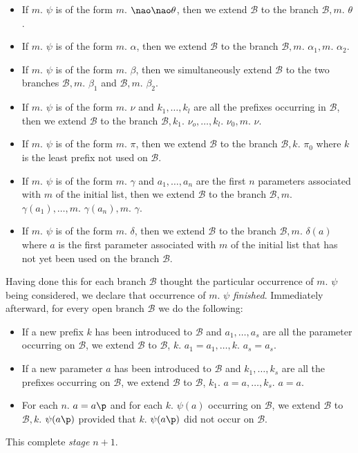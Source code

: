 \begin{defn}
\begin{itemize}
\item If $m.$ $\psi$ is of the form $m.$ $\nao \nao \theta$, then we extend $\mathcal{B}$ to the branch $\mathcal{B}, m.$ $\theta$. 
\item If $m.$ $\psi$ is of the form $m.$ $\alpha$, then we extend $\mathcal{B}$ to the branch $\mathcal{B}, m.$ $\alpha_{1},m.$ $\alpha_{2}$. 
\item If $m.$ $\psi$ is of the form $m.$ $\beta$, then we simultaneously extend $\mathcal{B}$ to the two branches $\mathcal{B}, m.$ $\beta_{1}$ and $\mathcal{B}, m.$ $\beta_{2}$.
\item If $m.$ $\psi$ is of the form $m.$ $\nu$ and $k_{1}, \dots , k_{l}$ are all the prefixes occurring in $\mathcal{B}$, then we extend $\mathcal{B}$ to the branch $\mathcal{B}, k_{1}.$ $\nu_{o}, \dots, k_{l}.$ $\nu_{0}, m.$ $\nu$.
\item If $m.$ $\psi$ is of the form $m.$ $\pi$, then we extend $\mathcal{B}$ to the branch $\mathcal{B}, k.$ $\pi_{0}$ where $k$ is the least prefix not used on $\mathcal{B}$.
\item If $m.$ $\psi$ is of the form $m.$ $\gamma$ and  $a_{1}, \dots , a_{n}$ are the first $n$ parameters associated with $m$ of the initial list, then we extend $\mathcal{B}$ to the branch $\mathcal{B}, m.$ $\gamma(a_{1}), \dots, m.$ $\gamma(a_{n}), m.$ $\gamma$.
\item If $m.$ $\psi$ is of the form $m.$ $\delta$, then we extend $\mathcal{B}$ to the branch $\mathcal{B}, m.$ $\delta(a)$ where $a$ is the first parameter associated with $m$ of the initial list that has not yet been used on the branch $\mathcal{B}$.
\end{itemize}

\qquad Having done this for each branch $\mathcal{B}$ thought the particular occurrence of $m.$ $\psi$  being considered, we declare that occurrence of $m.$ $\psi$  \textit{finished}. Immediately afterward, for every open branch $\mathcal{B}$ we do the following:

\begin{itemize}
\item If a new prefix $k$ has been introduced to $\mathcal{B}$ and $a_{1}, \dots, a_{s}$ are all the parameter occurring on $\mathcal{B}$, we extend $\mathcal{B}$ to $\mathcal{B}$, $k.$ $a_{1} = a_{1}, \dots,k.$ $a_{s} = a_{s}$.   
\item If a new parameter $a$ has been introduced to $\mathcal{B}$ and $k_{1}, \dots, k_{s}$ are all the prefixes occurring on $\mathcal{B}$, we extend $\mathcal{B}$ to $\mathcal{B}$, $k_{1}.$ $a=a, \dots,k_{s}.$ $a = a$.   
\item For each $n.$ $a = a\p$ and for each $k.$ $\psi(a)$ occurring on $\mathcal{B}$, we extend $\mathcal{B}$ to $\mathcal{B}, k.$ $\psi(a\p)$ provided that $k.$ $\psi(a\p)$ did not occur on $\mathcal{B}$.  
\end{itemize}

\qquad This complete \textit{stage} $n+1$.
\end{defn}

